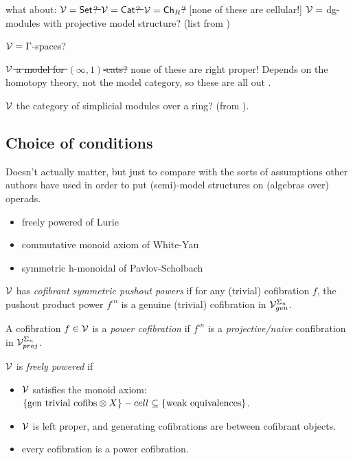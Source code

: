 \documentclass[a4paper,10pt
,draft
]{article}%
\renewcommand{\1}{\eta}%
\begin{document}
\begin{example}
      what about:
      \sout{$\mathcal V = \mathsf{Set}$? $\mathcal V = \mathsf{Cat}$? $\mathcal V = \mathsf{Ch}_R$?} [none of these are cellular!]
      $\mathcal V = $ dg-modules with projective model structure?
      (list from \cite{BM13})
          
      $\mathcal V = \Gamma$-spaces?

      \sout{ $\mathcal V$ a model for $(\infty, 1)$-cats?} none of these are right proper! Depends on the homotopy theory, not the model category, so these are all out \cite{CisOF}.
 
      $\mathcal V$ the category of simplicial modules over a ring? \cite[\S 3.1.15]{Rez96}  (from \cite[Example 4.23]{Cav}).
\end{example}





\subsection{Choice of conditions}

Doesn't actually matter, but just to compare with the sorts of assumptions other authors have used in order to put (semi)-model structures on (algebras over) operads.

\begin{itemize}
\item freely powered of Lurie
\item commutative monoid axiom of White-Yau
\item symmetric h-monoidal of Pavlov-Scholbach
\end{itemize}

\begin{definition}
      $\mathcal V$ has \textit{cofibrant symmetric pushout powers} if
      for any (trivial) cofibration $f$, the pushout product power $f^{\square n}$ is a genuine (trivial) cofibration in $\mathcal V^{\Sigma_n}_{gen}$. 
\end{definition}

\begin{definition}
      A cofibration $f \in \mathcal V$ is a \textit{power cofibration} if $f^{\square n}$ is a \textit{projective/naive} confibration in $\mathcal V^{\Sigma_n}_{proj}$.

      $\mathcal V$ is \textit{freely powered} if
      \begin{itemize}
      \item $\mathcal V$ satisfies the monoid axiom: $\left\{\mbox{gen trivial cofibs} \otimes X\right\}-cell \subseteq \left\{\mbox{weak equivalences}\right\}$.
      \item $\mathcal V$ is left proper, and generating cofibrations are between cofibrant objects.
      \item every cofibration is a power cofibration.            
      \end{itemize}
\end{definition}
\end{document}
